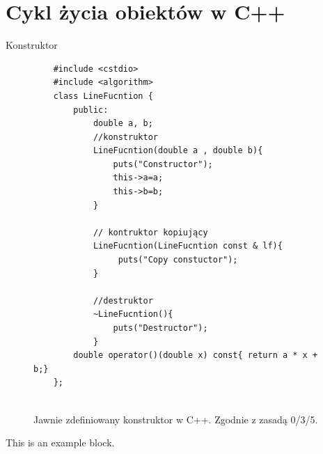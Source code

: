 \documentclass[xcolor=table]{beamer}
\begin{document}
\section{Cykl życia obiektów w C++}








\begin{frame}[containsverbatim]{Konstruktor}
    \begin{figure}
        \centering
        \tiny
    \begin{verbatim}
    #include <cstdio>
    #include <algorithm>
    class LineFucntion {
        public:
            double a, b;
            //konstruktor
            LineFucntion(double a , double b){ 
                puts("Constructor");
                this->a=a;
                this->b=b;
            }

            // kontruktor kopiujący 
            LineFucntion(LineFucntion const & lf){
                 puts("Copy constuctor");
            }

            //destruktor
            ~LineFucntion(){
                puts("Destructor");
            }
        double operator()(double x) const{ return a * x + b;}
    };


    \end{verbatim}
        \label{fig:cpp-constructor}
        \caption{Jawnie zdefiniowany konstruktor w C++. Zgodnie z zasadą 0/3/5.}
    \end{figure}
    
\end{frame}

\begin{frame}
   \begin{block}
       This is an example block. 
   \end{block} 
\end{frame}
\end{document}
